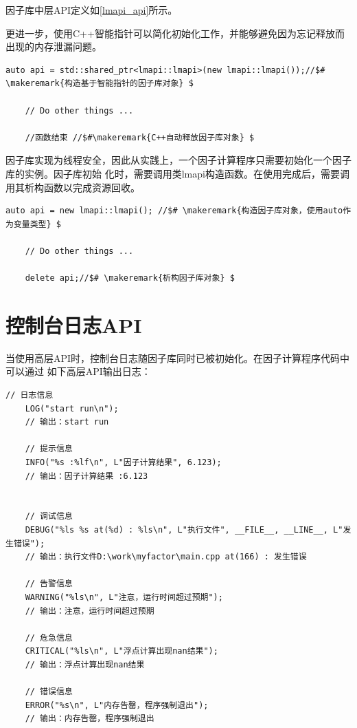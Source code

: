 \highlevelapiend

因子库中层API定义如\ref{lmapi_api}所示。




更进一步，使用C++智能指针可以简化初始化工作，并能够避免因为忘记释放而出现的内存泄漏问题。\\

\begin{lstlisting}[caption=中层API接口加智能指针]
    auto api = std::shared_ptr<lmapi::lmapi>(new lmapi::lmapi());//$# \makeremark{构造基于智能指针的因子库对象} $

    // Do other things ...

    //函数结束 //$#\makeremark{C++自动释放因子库对象} $
\end{lstlisting}
\showremarks

因子库实现为线程安全，因此从实践上，一个因子计算程序只需要初始化一个因子库的实例。因子库初始
化时，需要调用类lmapi构造函数。在使用完成后，需要调用其析构函数以完成资源回收。\\

\begin{lstlisting}[caption=中层API接口]
    auto api = new lmapi::lmapi(); //$# \makeremark{构造因子库对象，使用auto作为变量类型} $

    // Do other things ...

    delete api;//$# \makeremark{析构因子库对象} $
\end{lstlisting}
\showremarks


\section{控制台日志API}

当使用高层API时，控制台日志随因子库同时已被初始化。在因子计算程序代码中可以通过
如下高层API输出日志：\\

\begin{lstlisting}[caption=高层API接口,morekeywords={INFO,LOG,DEBUG,WARNING,CRITICAL,ERROR}]
    // 日志信息
    LOG("start run\n");
    // 输出：start run

    // 提示信息
    INFO("%s :%lf\n", L"因子计算结果", 6.123);
    // 输出：因子计算结果 :6.123


    // 调试信息
    DEBUG("%ls %s at(%d) : %ls\n", L"执行文件", __FILE__, __LINE__, L"发生错误");
    // 输出：执行文件D:\work\myfactor\main.cpp at(166) : 发生错误

    // 告警信息
    WARNING("%ls\n", L"注意，运行时间超过预期");
    // 输出：注意，运行时间超过预期

    // 危急信息
    CRITICAL("%ls\n", L"浮点计算出现nan结果");
    // 输出：浮点计算出现nan结果

    // 错误信息
    ERROR("%s\n", L"内存告罄，程序强制退出");
    // 输出：内存告罄，程序强制退出



\end{lstlisting}



